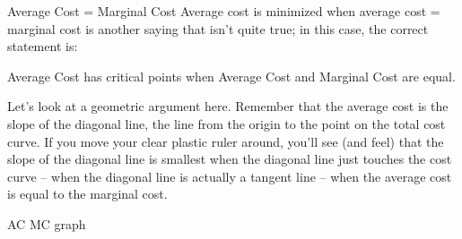 Average Cost = Marginal Cost
Average cost is minimized when average cost = marginal cost is another saying that isn’t quite true; in this case, the correct statement is:

Average Cost has critical points when Average Cost and Marginal Cost are equal.

Let’s look at a geometric argument here. Remember that the average cost is the slope of the diagonal line, the line from the origin to the point on the total cost curve. If you move your clear plastic ruler around, you’ll see (and feel) that the slope of the diagonal line is smallest when the diagonal line just touches the cost curve – when the diagonal line is actually a tangent line – when the average cost is equal to the marginal cost.

AC MC graph
